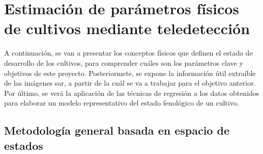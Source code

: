 \section{Estimación de parámetros físicos de cultivos mediante teledetección}
\par A continuación, se van a presentar los conceptos físicos que definen el estado de desarrollo de los cultivos, para comprender cuáles son los parámetros clave y objetivos de este proyecto. Posteriormete, se expone la información útil extraíble de las imágenes \gls{sar}, a partir de la cuál se va a trabajar para el objetivo anterior. Por último, se verá la aplicación de las técnicas de regresión a los datos obtenidos para elaborar un modelo representativo del estado fenológico de un cultivo.

\subsection{Metodología general basada en espacio de estados}
